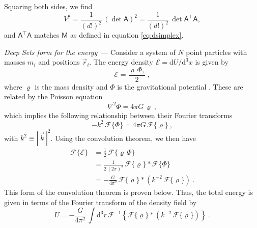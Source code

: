 \documentclass[10pt]{article}
\renewcommand{\paragraph}[1]{\par\addvspace{1em}\noindent\textsl{#1}~---}
\renewcommand{\d}{\mathrm{d}}
\newcommand{\abs}[1]{|\,{#1}\,|}
\begin{document}
Squaring both sides, we find
\begin{equation}
    V^2
    = \frac{1}{(d!)^2} \, (\det \mathsf{A})^2
    = \frac{1}{(d!)^2} \, \det \mathsf{A}^\top \mathsf{A},
\end{equation}
and $\mathsf{A}^\top \mathsf{A}$ matches $\mathsf{M}$ as defined in equation \eqref{eq:dsimplex}.

\paragraph{Deep Sets form for the energy} Consider a system of $N$ point particles with masses $m_i$ and positions $\vec{r}_i$.
The energy density $\mathcal{E} = \d U / \d^3 x$ is given by
\begin{equation}
    \mathcal{E} = \frac{\varrho \, \Phi,}{2}~,
\end{equation}
where $\varrho$ is the mass density and $\Phi$ is the gravitational potential \citep{LandauLifshitzFields}.
These are related by the Poisson equation
\begin{equation}
    \nabla^2 \Phi = 4 \pi G \, \varrho~,
\end{equation}
which implies the following relationship between their Fourier transforms
\begin{equation}
    -k^2 \, \mathcal{F}\{\Phi\} = 4 \pi G \, \mathcal{F}\{\varrho\}~,
\end{equation}
with $k^2 \equiv \abs{\vec{k}}^2$.
Using the convolution theorem, we then have
\begin{align}
    \mathcal{F}\{\mathcal{E}\}
    &= \frac{1}{2} \, \mathcal{F}\{\varrho \, \Phi\} \nonumber\\
    &= \frac{1}{2 \, (2\pi)^3} \, \mathcal{F}\{\varrho\} \ast \mathcal{F}\{\Phi\} \nonumber\\
    &= -\frac{G}{4\pi^2} \, \mathcal{F}\{\varrho\} \ast \left( k^{-2} \, \mathcal{F}\{\varrho\} \right)~.
    \label{eq:ConvolutionThm}
\end{align}
This form of the convolution theorem is proven below.
Thus, the total energy is given in terms of the Fourier transform of the density field by
\begin{equation}
    U 
    = -\frac{G}{4 \pi^2} \,
        \int \d^3 r \,
        \mathcal{F}^{-1} \! \left\{
            \mathcal{F}\{\varrho\} \ast \left(
            k^{-2} \, \mathcal{F}\{\varrho\} \right)
        \right\}~.
\end{equation}
\end{document}
